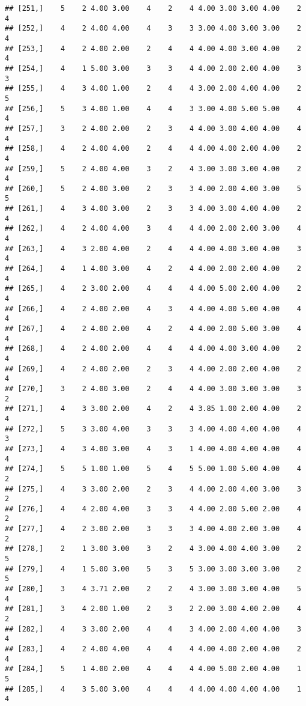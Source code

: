 \documentclass[]{article}
\begin{document}
\begin{verbatim}
## [251,]    5    2 4.00 3.00    4    2    4 4.00 3.00 3.00 4.00    2    4
## [252,]    4    2 4.00 4.00    4    3    3 3.00 4.00 3.00 3.00    2    4
## [253,]    4    2 4.00 2.00    2    4    4 4.00 4.00 3.00 4.00    2    4
## [254,]    4    1 5.00 3.00    3    3    4 4.00 2.00 2.00 4.00    3    3
## [255,]    4    3 4.00 1.00    2    4    4 3.00 2.00 4.00 4.00    2    5
## [256,]    5    3 4.00 1.00    4    4    3 3.00 4.00 5.00 5.00    4    4
## [257,]    3    2 4.00 2.00    2    3    4 4.00 3.00 4.00 4.00    4    4
## [258,]    4    2 4.00 4.00    2    4    4 4.00 4.00 2.00 4.00    2    4
## [259,]    5    2 4.00 4.00    3    2    4 3.00 3.00 3.00 4.00    2    4
## [260,]    5    2 4.00 3.00    2    3    3 4.00 2.00 4.00 3.00    5    5
## [261,]    4    3 4.00 3.00    2    3    3 4.00 3.00 4.00 4.00    2    4
## [262,]    4    2 4.00 4.00    3    4    4 4.00 2.00 2.00 3.00    4    4
## [263,]    4    3 2.00 4.00    2    4    4 4.00 4.00 3.00 4.00    3    4
## [264,]    4    1 4.00 3.00    4    2    4 4.00 2.00 2.00 4.00    2    4
## [265,]    4    2 3.00 2.00    4    4    4 4.00 5.00 2.00 4.00    2    4
## [266,]    4    2 4.00 2.00    4    3    4 4.00 4.00 5.00 4.00    4    4
## [267,]    4    2 4.00 2.00    4    2    4 4.00 2.00 5.00 3.00    4    4
## [268,]    4    2 4.00 2.00    4    4    4 4.00 4.00 3.00 4.00    2    4
## [269,]    4    2 4.00 2.00    2    3    4 4.00 2.00 2.00 4.00    2    4
## [270,]    3    2 4.00 3.00    2    4    4 4.00 3.00 3.00 3.00    3    2
## [271,]    4    3 3.00 2.00    4    2    4 3.85 1.00 2.00 4.00    2    4
## [272,]    5    3 3.00 4.00    3    3    3 4.00 4.00 4.00 4.00    4    3
## [273,]    4    3 4.00 3.00    4    3    1 4.00 4.00 4.00 4.00    4    4
## [274,]    5    5 1.00 1.00    5    4    5 5.00 1.00 5.00 4.00    4    2
## [275,]    4    3 3.00 2.00    2    3    4 4.00 2.00 4.00 3.00    3    2
## [276,]    4    4 2.00 4.00    3    3    4 4.00 2.00 5.00 2.00    4    2
## [277,]    4    2 3.00 2.00    3    3    3 4.00 4.00 2.00 3.00    4    2
## [278,]    2    1 3.00 3.00    3    2    4 3.00 4.00 4.00 3.00    2    5
## [279,]    4    1 5.00 3.00    5    3    5 3.00 3.00 3.00 3.00    2    5
## [280,]    3    4 3.71 2.00    2    2    4 3.00 3.00 3.00 4.00    5    4
## [281,]    3    4 2.00 1.00    2    3    2 2.00 3.00 4.00 2.00    4    2
## [282,]    4    3 3.00 2.00    4    4    3 4.00 2.00 4.00 4.00    3    4
## [283,]    4    2 4.00 4.00    4    4    4 4.00 4.00 2.00 4.00    2    4
## [284,]    5    1 4.00 2.00    4    4    4 4.00 5.00 2.00 4.00    1    5
## [285,]    4    3 5.00 3.00    4    4    4 4.00 4.00 4.00 4.00    1    4

\end{verbatim}
\end{document}
